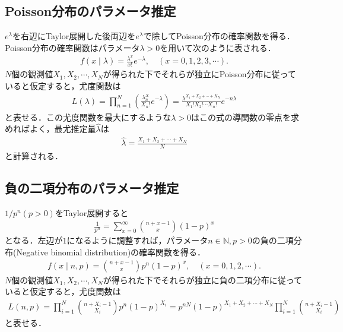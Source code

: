\documentclass[a4j,papersize,disablejfam,slide,14pt]{jsarticle}
\def\exp#1{e^{#1}} %
\begin{document}
\subsection{{\rm Poisson}分布のパラメータ推定}
	$\exp{\lambda}$を右辺に{\rm Taylor}展開した後両辺を$\exp{\lambda}$で除して{\rm Poisson}分布の確率関数を得る．
    {\rm Poisson}分布の確率関数はパラメータ$\lambda>0$を用いて次のように表される．
    \begin{align}
    	f(x \mid \lambda) = \frac{\lambda^x}{x!} \exp{-\lambda}, \quad(x=0,1,2,3,\cdots).
    \end{align}
    $N$個の観測値$X_1, X_2, \cdots, X_N$が得られた下でそれらが独立に{\rm Poisson}分布に従っていると仮定すると，尤度関数は
    \begin{align}
    	L(\lambda) = \prod_{n=1}^{N} \left( \frac{\lambda^X_n}{X_n!} \exp{-\lambda} \right) = \frac{\lambda^{X_1+X_2+\cdots+X_N}}{X_1!X_2!\cdots X_n!} \exp{-n\lambda}
    \end{align}
    と表せる．この尤度関数を最大にするような$\lambda>0$はこの式の導関数の零点を求めればよく，最尤推定量$\hat{\lambda}$は
    \begin{align}
    	\hat{\lambda} = \frac{X_1+X_2+\cdots+X_N}{N}
    \end{align}
    と計算される．

\subsection{負の二項分布のパラメータ推定}
	$1/p^n(p>0)$を{\rm Taylor}展開すると
    \begin{align}
    	\frac{1}{p^n} = \sum_{x=0}^{\infty} \binom{n+x-1}{x} (1-p)^x
    \end{align}
    となる．左辺が$1$になるように調整すれば，パラメータ$n \in \mathbb{N}, p>0$の負の二項分布({\rm Negative binomial distribution})の確率関数を得る．
    \begin{align}
    	f(x \mid n,p) = \binom{n+x-1}{x} p^n (1-p)^x, \quad(x=0,1,2,\cdots).
    \end{align}
    $N$個の観測値$X_1, X_2, \cdots, X_N$が得られた下でそれらが独立に負の二項分布に従っていると仮定すると，尤度関数は
    \begin{align}
    	L(n,p) = \prod_{i=1}^{N} \binom{n+X_i-1}{X_i} p^n (1-p)^{X_i} = p^{nN} (1-p)^{X_1+X_2+\cdots+X_N} \prod_{i=1}^{N} \binom{n+X_i-1}{X_i}
    \end{align}
    と表せる．
\end{document}
